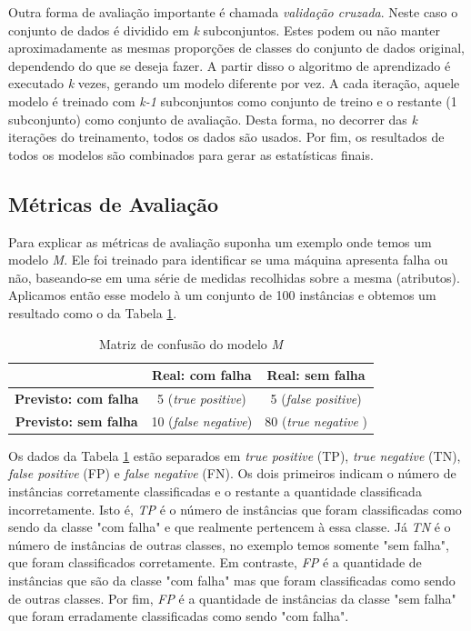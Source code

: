 Outra forma de avaliação importante é chamada \textit{validação cruzada}.
Neste caso o conjunto de dados é dividido em \textit{k} subconjuntos.
Estes podem ou não manter aproximadamente as mesmas proporções de classes do conjunto de dados original, dependendo do que se deseja fazer.
A partir disso o algoritmo de aprendizado é executado \textit{k} vezes, gerando um modelo diferente por vez.
A cada iteração, aquele modelo é treinado com \textit{k-1} subconjuntos como conjunto de treino e o restante (1 subconjunto) como conjunto de avaliação.
Desta forma, no decorrer das \textit{k} iterações do treinamento, todos os dados são usados.
Por fim, os resultados de todos os modelos são combinados para gerar as estatísticas finais.

\subsection{Métricas de Avaliação}

Para explicar as métricas de avaliação suponha um exemplo onde temos um modelo \textit{M}.
Ele foi treinado para identificar se uma máquina apresenta falha ou não, baseando-se em uma série de medidas recolhidas sobre a mesma (atributos).
Aplicamos então esse modelo à um conjunto de 100 instâncias e obtemos um resultado como o da Tabela \ref{tab:positivosenegativos}.

\begin{table}[h!]
  \begin{center}
    \begin{tabular}{ccc}
      \hline
        & \textbf{Real: com falha} & \textbf{Real: sem falha} \\
      \hline

      \textbf{Previsto: com falha} & 5 (\textit{true positive}) & 5 (\textit{false positive}) \\
      \textbf{Previsto: sem falha} & 10 (\textit{false negative}) & 80 (\textit{true negative} )\\

      \hline
    \end{tabular}
    \caption{Matriz de confusão do modelo \textit{M}}
    \label{tab:positivosenegativos}
  \end{center}
\end{table}

Os dados da Tabela \ref{tab:positivosenegativos} estão separados em \textit{true positive} (TP), \textit{true negative} (TN), \textit{false positive} (FP) e \textit{false negative} (FN).
Os dois primeiros indicam o número de instâncias corretamente classificadas e o restante a quantidade classificada incorretamente.
Isto é, \textit{TP} é o número de instâncias que foram classificadas como sendo da classe "com falha" e que realmente pertencem à essa classe.
Já \textit{TN} é o número de instâncias de outras classes, no exemplo temos somente "sem falha", que foram classificados corretamente.
Em contraste, \textit{FP} é a quantidade de instâncias que são da classe "com falha" mas que foram classificadas como sendo de outras classes.
Por fim, \textit{FP} é a quantidade de instâncias da classe "sem falha" que foram erradamente classificadas como sendo "com falha".


